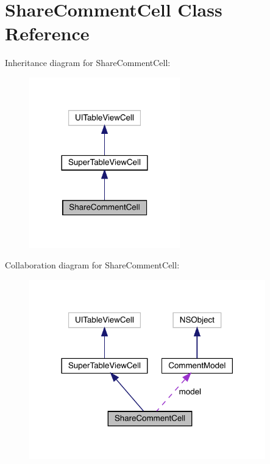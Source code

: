 \hypertarget{interface_share_comment_cell}{}\section{Share\+Comment\+Cell Class Reference}
\label{interface_share_comment_cell}


Inheritance diagram for Share\+Comment\+Cell\+:\nopagebreak
\begin{figure}[H]
\begin{center}
\leavevmode
\includegraphics[width=185pt]{interface_share_comment_cell__inherit__graph}
\end{center}
\end{figure}


Collaboration diagram for Share\+Comment\+Cell\+:\nopagebreak
\begin{figure}[H]
\begin{center}
\leavevmode
\includegraphics[width=290pt]{interface_share_comment_cell__coll__graph}
\end{center}
\end{figure}
